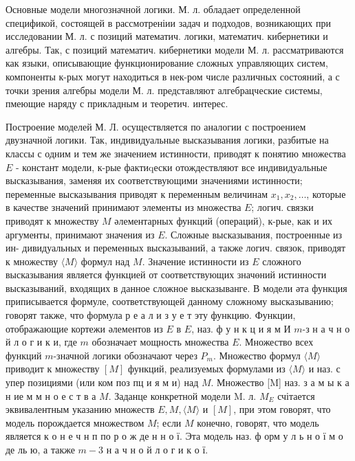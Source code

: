 \documentclass[10pt]{article}
\begin{document}
Основные модели многозначной логики. М. л. обладает определенной спецификой, состоящей в рассмотреніии задач и подходов, возникающих при исследовании М. л. с позиций математич. логики, математич. кибернетики и алгебры. Так, с позиций математич. кибернетики модели М. л. рассматриваются как языки, описывающие функционирование сложных управляющих систем, компоненты к-рых могут находиться в нек-ром числе различных состояний, а с точки зрения алгебры модели М. л. представляют алгебрацческие системы, пмеющие наряду с прикладным и теоретич. интерес.



Построение моделей М. Л. осуществляется по аналогии с построением двузначной логики. Так, индивидуальные высказывания логики, разбитые на классы с одним и тем же значением истинности, приводят к понятию множества $E$ - констант модели, к-рые фактиqески отождествляют все индивидуальные высказывания, заменяя их соответствующими значениями истинности; переменные высказывания приводят к переменным величинам $x_{1}, x_{2}, \ldots$, которые в качестве значений принимают элементы из множества $E$; логич. связки приводят к множеству $M$ әлементарных функций (операций), к-рые, как и их аргументы, принимают значения из $E$. Сложные высказывания, построенные из ин- дивидуальных и переменных высказываний, а также логич. связок, приводят к множеству $\langle M\rangle$ формул над $M$. Значение истинности из $E$ сложного высказывания является функцией от соответствующих значөний истинности высказываний, входящих в данное сложное высказыванге. В модели әта функция приписывается формуле, соответствующей данному сложному высказыванию; говорят также, что формула р е а л и з у е т эту функцию. Функции, отображающие кортежи әлементов из $E$ в $E$, наз. ф у н к ц и я м И $m$-з н а ч н о й л о г и к и, где $m$ обозначает мощность множества $E$. Множество всех функций $m$-значной логики обозначают через $P_{m}$. Множество формул $\langle M\rangle$ приводит к множеству $[M]$ функций, реализуемых формулами из $\langle M\rangle$ и наз. с упер позициями (или ком поз пц и я м и) над $M$. Множество [M] наз. з а м ы к а н ие м м н о е с т в а $M$. Заданце конкретной модели M. л. $M_{E}$ счітается эквивалентным указанию множеств $E, M,\langle M\rangle$ и $[M]$, при этом говорят, что модель порождается множеством $M$; если $M$ конечно, говорят, что модель является к о н е ч н п по р о ж де н н о ї. Эта модель наз. ф орм у л ь н о ї м о де ль ю, а также $m-3$ н а ч н о й л $о$ г и к о ї.
\end{document}
